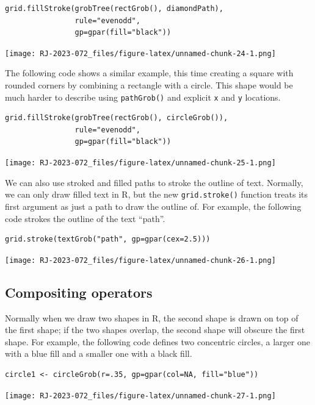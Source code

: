 \begin{verbatim}
grid.fillStroke(grobTree(rectGrob(), diamondPath),
                rule="evenodd",
                gp=gpar(fill="black"))
\end{verbatim}

\texttt{[image: RJ-2023-072\_files/figure-latex/unnamed-chunk-24-1.png]}

The following code shows a similar example, this time creating a
square with rounded corners by combining a rectangle with a circle.
This shape would be much harder to describe using \texttt{pathGrob()} and
explicit \texttt{x} and \texttt{y} locations.

\begin{verbatim}
grid.fillStroke(grobTree(rectGrob(), circleGrob()),
                rule="evenodd",
                gp=gpar(fill="black"))
\end{verbatim}

\texttt{[image: RJ-2023-072\_files/figure-latex/unnamed-chunk-25-1.png]}

We can also use stroked and filled paths to stroke the outline
of text. Normally, we can only draw filled text in R, but the new
\texttt{grid.stroke()} function treats its first argument as just a path
to draw the outline of. For example, the following code strokes the
outline of the text ``path''.

\begin{verbatim}
grid.stroke(textGrob("path", gp=gpar(cex=2.5)))
\end{verbatim}

\texttt{[image: RJ-2023-072\_files/figure-latex/unnamed-chunk-26-1.png]}

\hypertarget{compositing-operators}{%
\subsection{Compositing operators}\label{compositing-operators}}

Normally when we draw two shapes in R, the second shape is drawn on
top of the first shape; if the two shapes overlap, the second shape
will obscure the first shape.
For example, the following code defines two concentric circles,
a larger one with a blue fill and a smaller one with a black fill.

\begin{verbatim}
circle1 <- circleGrob(r=.35, gp=gpar(col=NA, fill="blue"))
\end{verbatim}

\texttt{[image: RJ-2023-072\_files/figure-latex/unnamed-chunk-27-1.png]}

